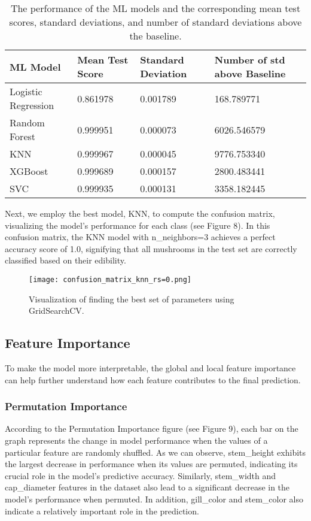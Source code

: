 \documentclass{article}
\begin{document}
\begin{table}[h]
\centering
\begin{tabular}{l|l|l|l}
\textbf{ML Model} & \textbf{Mean Test Score} & \textbf{Standard Deviation} & \textbf{Number of std above Baseline}\\\hline
Logistic Regression & 0.861978 & 0.001789 & 168.789771\\ \hline
Random Forest & 0.999951 & 0.000073 & 6026.546579 \\ \hline
KNN & 0.999967 & 0.000045 & 9776.753340 \\ \hline
XGBoost & 0.999689 & 0.000157 & 2800.483441 \\ \hline
SVC & 0.999935 & 0.000131 & 3358.182445 \\
\end{tabular}
\caption{\label{tab:widgets} The performance of the ML models and the corresponding mean test scores, standard deviations, and number of standard deviations above the baseline.}
\end{table}

\newpage
Next, we employ the best model, KNN, to compute the confusion matrix, visualizing the model's performance for each class (see Figure 8). In this confusion matrix, the KNN model with n\_neighbors=3 achieves a perfect accuracy score of 1.0, signifying that all mushrooms in the test set are correctly classified based on their edibility.

\begin{figure}[h]
\centering
\texttt{[image: confusion\_matrix\_knn\_rs=0.png]}
\caption{\label{fig:confusion matrix} Visualization of finding the best set of parameters using GridSearchCV.}
\end{figure}

\subsection{Feature Importance}
\hspace{0.5cm} To make the model more interpretable, the global and local feature importance can help further understand how each feature contributes to the final prediction.

\subsubsection{Permutation Importance}
\hspace{0.5cm} According to the Permutation Importance figure (see Figure 9), each bar on the graph represents the change in model performance when the values of a particular feature are randomly shuffled. As we can observe, stem\_height exhibits the largest decrease in performance when its values are permuted, indicating its crucial role in the model's predictive accuracy. Similarly, stem\_width and cap\_diameter features in the dataset also lead to a significant decrease in the model's performance when permuted. In addition, gill\_color and stem\_color also indicate a relatively important role in the prediction.
\end{document}
